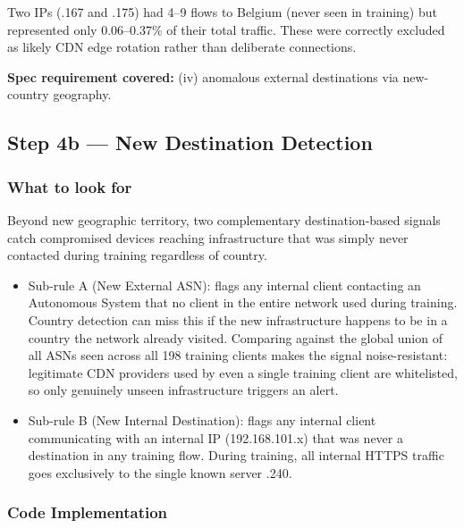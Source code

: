\documentclass[
  11pt,
]{article}
\providecommand{\tightlist}{%
  \setlength{\itemsep}{0pt}\setlength{\parskip}{0pt}}
\begin{document}
Two IPs (.167 and .175) had 4--9 flows to Belgium (never seen in
training) but represented only 0.06--0.37\% of their total traffic. These were correctly excluded as
likely CDN edge rotation rather than deliberate connections.

\medskip
\noindent\colorbox{gray!12}{\parbox{\dimexpr\linewidth-2\fboxsep\relax}{\textbf{Spec requirement covered:} (iv) anomalous external destinations via new-country geography.}}

\hypertarget{new-destination-detection}{%
\subsection{Step 4b — New Destination Detection}\label{new-destination-detection}}

\hypertarget{what-to-look-for-4}{%
\subsubsection{What to look for}\label{what-to-look-for-4}}

Beyond new geographic territory, two complementary destination-based
signals catch compromised devices reaching infrastructure that was
simply never contacted during training regardless of country.

\begin{itemize}
\tightlist
\item
  Sub-rule A (New External ASN): flags any internal client contacting an
  Autonomous System that no
  client in the entire network used during training. Country detection
  can miss this if the new infrastructure happens to be in a country the
  network already visited. Comparing against the global union of all
  ASNs seen across all 198 training clients makes the signal
  noise-resistant: legitimate CDN providers used by even a single
  training client are whitelisted, so only genuinely unseen
  infrastructure triggers an alert.
\item
  Sub-rule B (New Internal Destination): flags any internal client
  communicating with an internal IP (192.168.101.x) that was never a
  destination in any training flow. During training, all internal HTTPS
  traffic goes exclusively to the single known server .240. 
\end{itemize}

\hypertarget{code-implementation-2}{%
\subsubsection{Code Implementation}\label{code-implementation-2}}
\end{document}
